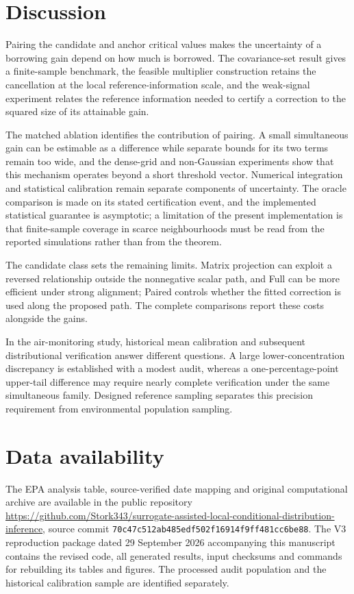 \section{Discussion}
Pairing the candidate and anchor critical values makes the uncertainty of a borrowing gain depend on how much is borrowed. The covariance-set result gives a finite-sample benchmark, the feasible multiplier construction retains the cancellation at the local reference-information scale, and the weak-signal experiment relates the reference information needed to certify a correction to the squared size of its attainable gain.

The matched ablation identifies the contribution of pairing. A small simultaneous gain can be estimable as a difference while separate bounds for its two terms remain too wide, and the dense-grid and non-Gaussian experiments show that this mechanism operates beyond a short threshold vector. Numerical integration and statistical calibration remain separate components of uncertainty. The oracle comparison is made on its stated certification event, and the implemented statistical guarantee is asymptotic; a limitation of the present implementation is that finite-sample coverage in scarce neighbourhoods must be read from the reported simulations rather than from the theorem.

The candidate class sets the remaining limits. Matrix projection can exploit a reversed relationship outside the nonnegative scalar path, and Full can be more efficient under strong alignment; Paired controls whether the fitted correction is used along the proposed path. The complete comparisons report these costs alongside the gains.

In the air-monitoring study, historical mean calibration and subsequent distributional verification answer different questions. A large lower-concentration discrepancy is established with a modest audit, whereas a one-percentage-point upper-tail difference may require nearly complete verification under the same simultaneous family. Designed reference sampling separates this precision requirement from environmental population sampling.

\section*{Data availability}
The EPA analysis table, source-verified date mapping and original computational archive are available in the public repository \url{https://github.com/Stork343/surrogate-assisted-local-conditional-distribution-inference}, source commit \texttt{70c47c512ab485edf502f16914f9ff481cc6be88}. The V3 reproduction package dated 29 September 2026 accompanying this manuscript contains the revised code, all generated results, input checksums and commands for rebuilding its tables and figures. The processed audit population and the historical calibration sample are identified separately.

